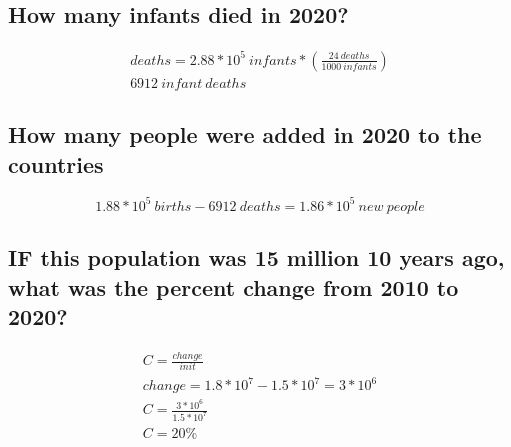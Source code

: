 \documentclass{article}
\begin{document}
\subsection{How many infants died in 2020?}

\begin{gather}
    deaths = 2.88 * 10^5\ infants * \left(\frac{24\ deaths}{1000\ infants}\right) \\
    6912\  infant\ deaths
\end{gather}

\subsection{How many people were added in 2020 to the countries}

\begin{equation}
    1.88 * 10^5\ births - 6912\ deaths = 1.86 * 10^5\ new\ people
 \end{equation}

\subsection{IF this population was 15 million 10 years ago, what was the
percent change from 2010 to 2020?}

\begin{gather}
    C = \frac{change}{init} \\
    change = 1.8 * 10^7 - 1.5 * 10^7 = 3 * 10^6 \\
    C = \frac{3 * 10^6}{1.5 * 10^7} \\
    C = 20\%
\end{gather}
\end{document}
